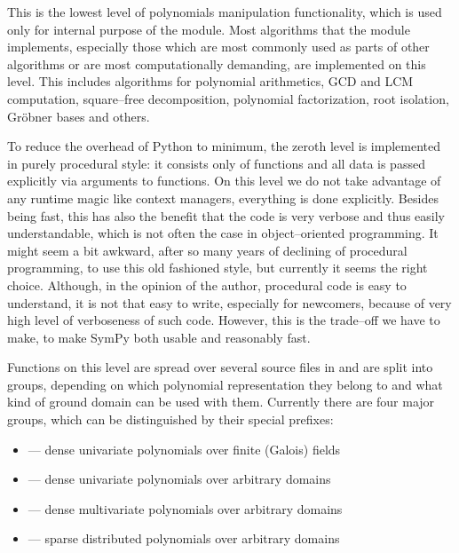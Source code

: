 This is the lowest level of polynomials manipulation functionality, which is used only for internal
purpose of the module. Most algorithms that the module implements, especially those which are most
commonly used as parts of other algorithms or are most computationally demanding, are implemented
on this level. This includes algorithms for polynomial arithmetics, GCD and LCM computation,
square--free decomposition, polynomial factorization, root isolation, Gröbner bases and others.

To reduce the overhead of Python to minimum, the zeroth level is implemented in purely procedural
style: it consists only of functions and all data is passed explicitly via arguments to functions.
On this level we do not take advantage of any runtime magic like context managers, everything is
done explicitly. Besides being fast, this has also the benefit that the code is very verbose and
thus easily understandable, which is not often the case in object--oriented programming. It might
seem a bit awkward, after so many years of declining of procedural programming, to use this old
fashioned style, but currently it seems the right choice. Although, in the opinion of the author,
procedural code is easy to understand, it is not that easy to write, especially for newcomers,
because of very high level of verboseness of such code. However, this is the trade--off we have
to make, to make SymPy both usable and reasonably fast.

Functions on this level are spread over several source files in  and are split into
groups, depending on which polynomial representation they belong to and what kind of ground domain
can be used with them. Currently there are four major groups, which can be distinguished by their
special prefixes:
\begin{itemize}
\item {} 
 --- dense univariate polynomials over finite (Galois) fields

\item {} 
 --- dense univariate polynomials over arbitrary domains

\item {} 
 --- dense multivariate polynomials over arbitrary domains

\item {} 
 --- sparse distributed polynomials over arbitrary domains

\end{itemize}

